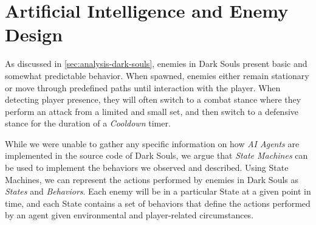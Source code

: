 




\section{Artificial Intelligence and Enemy Design}

As discussed in \ref{sec:analysis-dark-souls}, enemies in Dark Souls present basic and somewhat predictable behavior. When spawned, enemies either remain stationary or move through predefined paths until interaction with the player. When detecting player presence, they will often switch to a combat stance where they perform an attack from a limited and small set, and then switch to a defensive stance for the duration of a \emph{Cooldown} timer.

While we were unable to gather any specific information on how \emph{AI Agents} are implemented in the source code of Dark Souls, we argue that \emph{State Machines} can be used to implement the behaviors we observed and described. Using State Machines, we can represent the actions performed by enemies in Dark Souls as \emph{States} and \emph{Behaviors}. Each enemy will be in a particular State at a given point in time, and each State contains a set of behaviors that define the actions performed by an agent given environmental and player-related circumstances.


